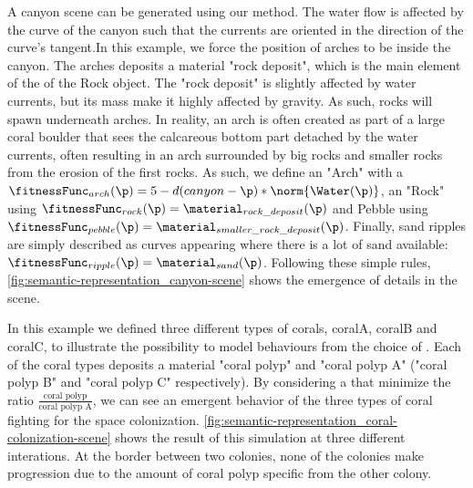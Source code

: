 A canyon scene can be generated using our method. The water flow is affected by the curve of the canyon such that the currents are oriented in the direction of the curve's tangent.In this example, we force the position of arches to be inside the canyon. The arches deposits a material "rock deposit", which is the main element of the  of the Rock object. The "rock deposit" is slightly affected by water currents, but its mass make it highly affected by gravity. As such, rocks will spawn underneath arches. In reality, an arch is often created as part of a large coral boulder that sees the calcareous bottom part detached by the water currents, often resulting in an arch surrounded by big rocks and smaller rocks from the erosion of the first rocks.
As such, we define an  "Arch" with a  $\fitnessFunc_{arch}(\p) = 5 - d(canyon - \p) * \norm{\Water(\p)}$, an  "Rock" using $\fitnessFunc_{rock}(\p) = \material_{rock\_deposit}(\p)$ and Pebble using $\fitnessFunc_{pebble}(\p) = \material_{smaller\_rock\_deposit}(\p)$. Finally, sand ripples are simply described as curves appearing where there is a lot of sand available: $\fitnessFunc_{ripple}(\p) = \material_{sand}(\p)$.
Following these simple rules, \cref{fig:semantic-representation_canyon-scene} shows the emergence of details in the scene. 

In this example we defined three different types of corals, coralA, coralB and coralC, to illustrate the possibility to model behaviours from the choice of . Each of the coral types deposits a material "coral polyp" and "coral polyp A" ("coral polyp B" and "coral polyp C" respectively). By considering a  that minimize the ratio $\frac{\text{coral polyp}}{\text{coral polyp A}}$, we can see an emergent behavior of the three types of coral fighting for the space colonization.
\cref{fig:semantic-representation_coral-colonization-scene} shows the result of this simulation at three different interations. At the border between two colonies, none of the colonies make progression due to the amount of coral polyp specific from the other colony.


